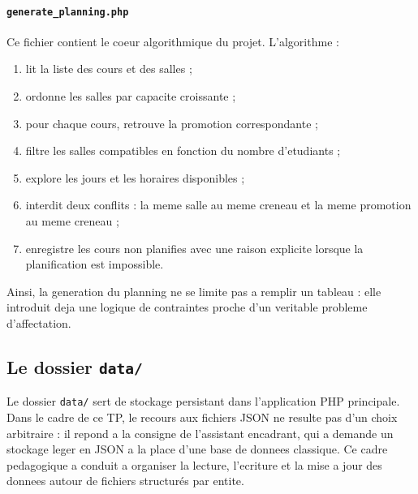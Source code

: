 \documentclass[12pt,a4paper]{article}
\begin{document}
\paragraph{\texttt{generate\_planning.php}}
Ce fichier contient le coeur algorithmique du projet. L'algorithme :
\begin{enumerate}
    \item lit la liste des cours et des salles ;
    \item ordonne les salles par capacite croissante ;
    \item pour chaque cours, retrouve la promotion correspondante ;
    \item filtre les salles compatibles en fonction du nombre d'etudiants ;
    \item explore les jours et les horaires disponibles ;
    \item interdit deux conflits : la meme salle au meme creneau et la meme promotion au meme creneau ;
    \item enregistre les cours non planifies avec une raison explicite lorsque la planification est impossible.
\end{enumerate}

Ainsi, la generation du planning ne se limite pas a remplir un tableau : elle introduit deja une logique de contraintes proche d'un veritable probleme d'affectation.

\subsection{Le dossier \texttt{data/}}
Le dossier \texttt{data/} sert de stockage persistant dans l'application PHP principale. Dans le cadre de ce TP, le recours aux fichiers JSON ne resulte pas d'un choix arbitraire : il repond a la consigne de l'assistant encadrant, qui a demande un stockage leger en JSON a la place d'une base de donnees classique. Ce cadre pedagogique a conduit a organiser la lecture, l'ecriture et la mise a jour des donnees autour de fichiers structurés par entite.
\end{document}
